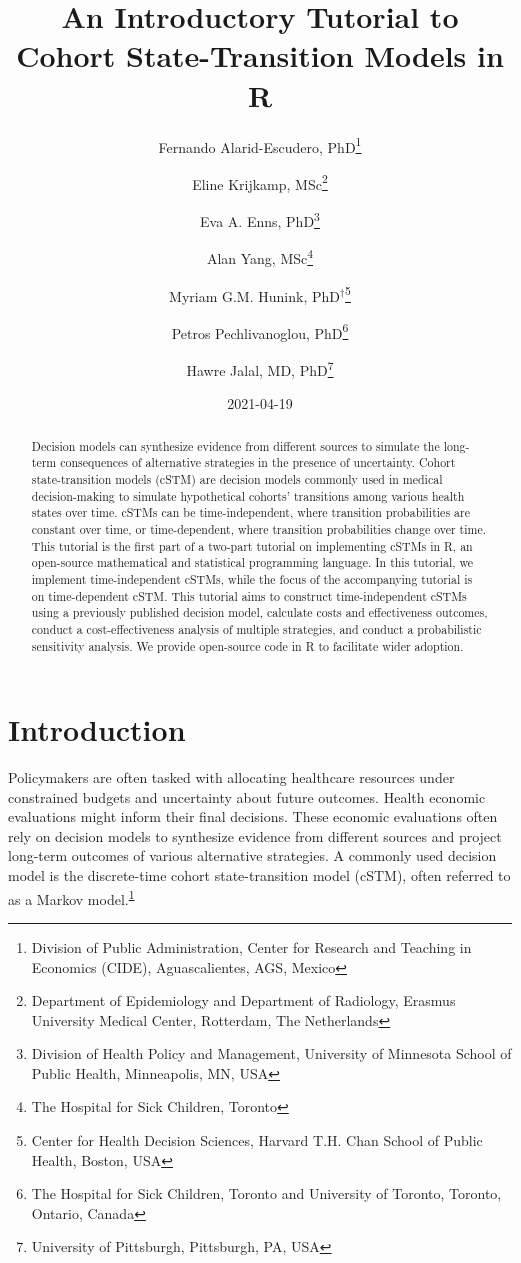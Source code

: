 \documentclass[
]{article}
\title{An Introductory Tutorial to Cohort State-Transition Models in R}
\author{Fernando Alarid-Escudero, PhD\footnote{Division of Public Administration, Center for Research and Teaching in Economics (CIDE), Aguascalientes, AGS, Mexico} \and Eline Krijkamp, MSc\footnote{Department of Epidemiology and Department of Radiology, Erasmus University Medical Center, Rotterdam, The Netherlands} \and Eva A. Enns, PhD\footnote{Division of Health Policy and Management, University of Minnesota School of Public Health, Minneapolis, MN, USA} \and Alan Yang, MSc\footnote{The Hospital for Sick Children, Toronto} \and Myriam G.M. Hunink, PhD\(^\dagger\)\footnote{Center for Health Decision Sciences, Harvard T.H. Chan School of Public Health, Boston, USA} \and Petros Pechlivanoglou, PhD\footnote{The Hospital for Sick Children, Toronto and University of Toronto, Toronto, Ontario, Canada} \and Hawre Jalal, MD, PhD\footnote{University of Pittsburgh, Pittsburgh, PA, USA}}
\date{2021-04-19}
\begin{document}
\maketitle
\begin{abstract}
Decision models can synthesize evidence from different sources to simulate the long-term consequences of alternative strategies in the presence of uncertainty. Cohort state-transition models (cSTM) are decision models commonly used in medical decision-making to simulate hypothetical cohorts' transitions among various health states over time. cSTMs can be time-independent, where transition probabilities are constant over time, or time-dependent, where transition probabilities change over time. This tutorial is the first part of a two-part tutorial on implementing cSTMs in R, an open-source mathematical and statistical programming language. In this tutorial, we implement time-independent cSTMs, while the focus of the accompanying tutorial is on time-dependent cSTM. This tutorial aims to construct time-independent cSTMs using a previously published decision model, calculate costs and effectiveness outcomes, conduct a cost-effectiveness analysis of multiple strategies, and conduct a probabilistic sensitivity analysis. We provide open-source code in R to facilitate wider adoption.
\end{abstract}

{
\setcounter{tocdepth}{2}
\tableofcontents
}
\hypertarget{introduction}{%
\section{Introduction}\label{introduction}}

Policymakers are often tasked with allocating healthcare resources under constrained budgets and uncertainty about future outcomes. Health economic evaluations might inform their final decisions. These economic evaluations often rely on decision models to synthesize evidence from different sources and project long-term outcomes of various alternative strategies. A commonly used decision model is the discrete-time cohort state-transition model (cSTM), often referred to as a Markov model.\textsuperscript{\protect\hyperlink{ref-Kuntz2017}{1}}
\end{document}
